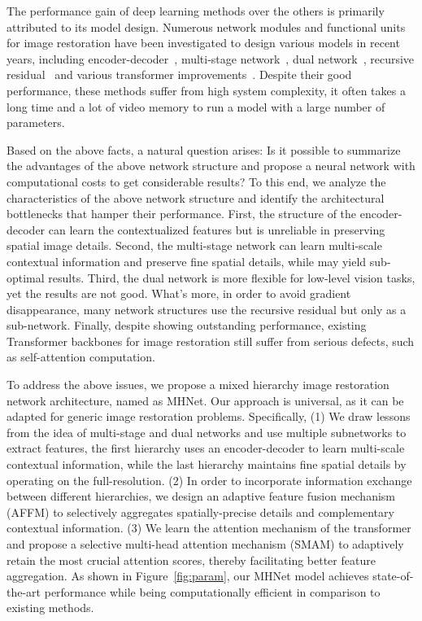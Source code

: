 \documentclass[lettersize,journal]{IEEEtran}
\begin{document}
The performance gain of deep learning methods over the others is primarily attributed to its model design. Numerous network modules and functional units for image restoration have been investigated to design various models in recent years, including encoder-decoder~\cite{chen2022simple,chu2022nafssr}, multi-stage network~\cite{Zamir2021MPRNet, Chen_2021_CVPR,PREnet,RESCAN}, dual network~\cite{2018LearningD, 2022Learning,2020Refining,chen2020decomposition}, recursive residual~\cite{zhang2018image,2019Real} and various transformer improvements~\cite{zhang2023accurate, Zamir2021Restormer, Tsai2022Stripformer,Wang_2022_CVPR}. Despite their good performance, these methods suffer from high system complexity, it often takes a long time and a lot of video memory to run a model with a large number of parameters. 


Based on the above facts, a natural question arises: Is it possible to summarize the advantages of the above network structure and propose a neural network with computational costs to get considerable results? To this end, we analyze the characteristics of the above network structure and identify the architectural bottlenecks that hamper their performance. First, the structure of the encoder-decoder can learn the contextualized features but is unreliable in preserving spatial image details. Second, the multi-stage network can learn multi-scale contextual information and preserve fine spatial details, while may yield sub-optimal results. Third, the dual network is more flexible for low-level vision tasks, yet the results are not good. What's more, in order to avoid gradient disappearance, many network structures use the  recursive residual but only as a sub-network. Finally, despite showing outstanding performance, existing Transformer backbones for image restoration still suffer from serious defects, such as self-attention computation. 

To address the above issues, we propose a mixed hierarchy image restoration network architecture, named as MHNet. Our approach is universal, as it can be adapted for generic image restoration problems. Specifically, (1) We draw lessons from the idea of multi-stage and dual networks and use multiple subnetworks to extract features, the first hierarchy uses an encoder-decoder to learn multi-scale contextual information, while the last hierarchy maintains fine spatial details by operating on the full-resolution. 
(2) In order to incorporate information exchange between different hierarchies, we design an adaptive feature fusion mechanism (AFFM) to selectively aggregates spatially-precise details and complementary contextual information. 
(3) We learn the attention mechanism of the transformer and propose a selective multi-head attention mechanism (SMAM) to adaptively retain the most crucial attention scores, thereby facilitating better feature aggregation. As shown in Figure~\ref{fig:param}, our MHNet model achieves state-of-the-art performance while being computationally efficient in comparison to existing methods.
\end{document}
